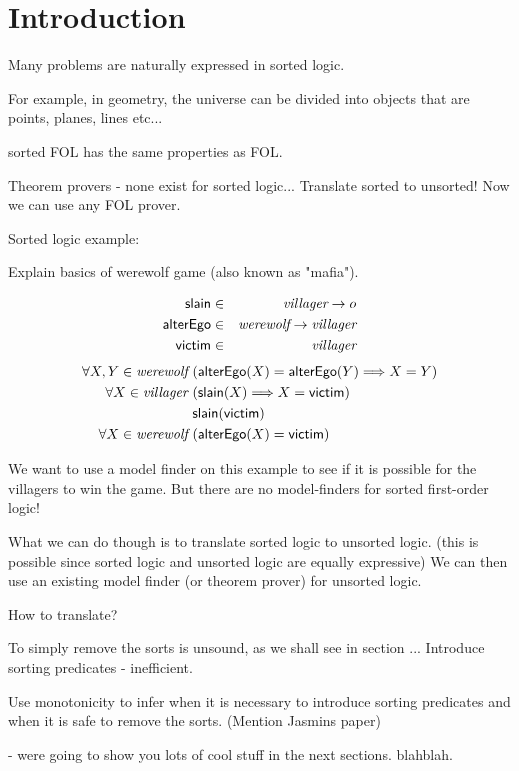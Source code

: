 \section{Introduction}

Many problems are naturally expressed in sorted logic.

For example, in geometry, the universe can be divided into 
objects that are points, planes, lines etc...

sorted FOL has the same properties as  FOL.

Theorem provers - none exist for sorted logic...
Translate sorted to unsorted! Now we can use any FOL prover.

Sorted logic example:

Explain basics of werewolf game (also known as "mafia").



\begin{example}
\label{ex:werewolf1}
\begin{eqnarray*}
\mbox {\sf slain} & \in & \textit{villager} \to o \\ 
\mbox {\sf alterEgo} & \in & \textit{werewolf} \to \textit{villager} \\
\mbox{\sf victim} & \in & \textit{villager} 
\end{eqnarray*}
\begin{align*}
\forall X,Y \in \textit{werewolf} \ & ( \mbox {\sf alterEgo} (X) = \mbox {\sf alterEgo} (Y) \Longrightarrow  X = Y) \\
 \forall X \in \textit{villager}\ & (\mbox {\sf slain}(X) \Longrightarrow X = \mbox{\sf victim}) \\
 & \mbox {\sf slain}(\mbox{\sf victim}) \\
 \forall X \in \textit{werewolf} \  & (\mbox {\sf alterEgo}(X) = \mbox{\sf victim})
\end{align*} 
\end{example}

We want to use a model finder on this example to see if it is possible
for the villagers to win the game. But there are no model-finders for
sorted first-order logic!

What we can do though is to translate sorted logic to unsorted logic. 
(this is possible since sorted logic and unsorted logic are equally expressive) 
We can then use an existing model finder (or theorem prover) for unsorted logic.

How to translate?

To simply remove the sorts is unsound, as we shall see in section ...
Introduce sorting predicates - inefficient.

Use monotonicity to infer when it is necessary to introduce sorting predicates
and when it is safe to remove the sorts. (Mention Jasmins paper)

- were going to show you lots of cool stuff in the next sections. blahblah.













